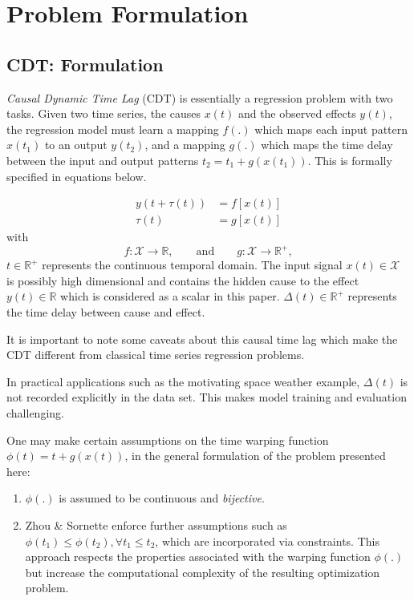 \documentclass[envcountsect,runningheads]{llncs}
\theoremstyle{etoile}
\begin{document}
\section{Problem Formulation}\label{sec:formulation}

\subsection{CDT: Formulation}

\emph{Causal Dynamic Time Lag} (CDT) is essentially a regression problem with two tasks. 
Given two time series, the causes $x(t)$ and the observed effects $y(t)$, the regression model 
must learn a mapping $f(.)$ which maps each input pattern $x(t_1)$ to an output $y(t_2)$, and a 
mapping $g(.)$ which maps the time delay between the input and output patterns $t_2 = t_1 + g(x(t_1))$. 
This is formally specified in equations below.

\begin{align}
y(t + \tau(t)) & = f[x(t)]\label{eq:pb1}\\
\tau(t) & = g[x(t)]\label{eq:pb2} 
\end{align}
with
\[
f: \mathcal{X}  \rightarrow \mathbb{R},\qquad\text{and}\qquad
g: \mathcal{X}  \rightarrow \mathbb{R}^{+},
\]
$t \in \mathbb{R}^{+}$ represents the continuous temporal domain. The input signal 
$x(t)\in \mathcal{X}$ is possibly high dimensional and contains the hidden cause to 
the effect $y(t)\in\mathbb{R}$ which is considered as a scalar in this paper. 
$\Delta(t)\in \mathbb{R}^+$ represents the time delay between cause and effect.

It is important to note some caveats about this causal time lag which make the CDT different from 
classical time series regression problems.

In practical applications such as the motivating space weather example, $\Delta(t)$ is not recorded 
explicitly in the data set. This makes model training and evaluation challenging.

One may make certain assumptions on the time warping function $\phi(t) = t + g(x(t))$, in the general 
formulation of the problem presented here: 

\begin{enumerate}
    \item $\phi(.)$ is assumed to be continuous and \emph{bijective}.
    \item Zhou \& Sornette \cite{ZHOU2006195} enforce further assumptions such as 
          $\phi(t_1) \leq \phi(t_2), \forall t_1 \leq t_2$, which are incorporated via constraints. 
          This approach respects the properties associated with the warping function $\phi(.)$ but 
          increase the computational complexity of the resulting optimization problem.
\end{enumerate}
\end{document}
